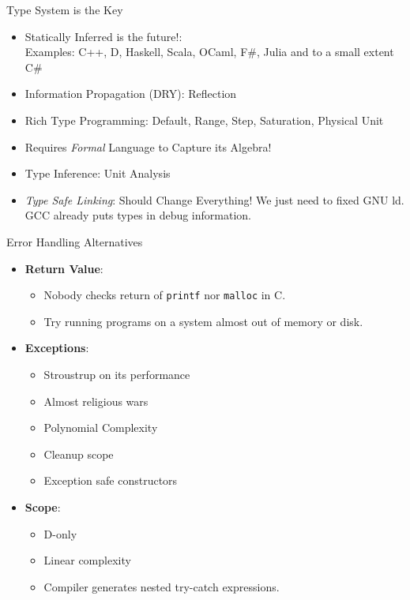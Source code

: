 \documentclass[xcolor=dvipsnames]{beamer}
\begin{document}
\begin{frame}[fragile]{Type System is the Key}
  \begin{itemize}[<+->]
  \item Statically Inferred is the future!:\\
    Examples: C++, D, Haskell, Scala, OCaml, F\#, Julia and to a small extent
    C\#
  \item Information Propagation (DRY): Reflection
  \item Rich Type Programming: Default, Range, Step, Saturation, Physical Unit
  \item Requires \emph{Formal} Language to Capture its Algebra!
  \item Type Inference: Unit Analysis
  \item \emph{Type Safe Linking}: Should Change Everything! We just need to
    fixed GNU ld. GCC already puts types in debug information.
  \end{itemize}
\end{frame}

\begin{frame}[fragile]{Error Handling Alternatives}
  \begin{itemize}[<+->]
  \item \textbf{Return Value}:
    \begin{itemize}[<+->]
    \item Nobody checks return of \texttt{printf} nor \texttt{malloc} in C.
    \item Try running programs on a system almost out of memory or disk.
    \end{itemize}
  \item \textbf{Exceptions}:
    \begin{itemize}[<+->]
    \item Stroustrup on its performance
    \item Almost religious wars
    \item Polynomial Complexity
    \item Cleanup scope
    \item Exception safe constructors
    \end{itemize}
  \item \textbf{Scope}:
    \begin{itemize}[<+->]
    \item D-only
    \item Linear complexity
    \item Compiler generates nested try-catch expressions.
    \end{itemize}
  \end{itemize}
\end{frame}
\end{document}

